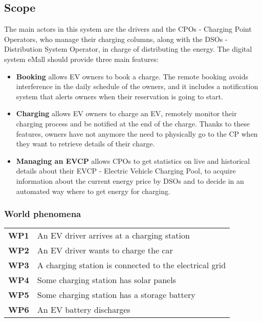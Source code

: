 \subsection{Scope}
The main actors in this system are the drivers and the CPOs - Charging Point Operators, who manage their charging columns, along with the DSOs - Distribution System Operator, in charge of distributing the energy.
The digital system eMall should provide three main features:
\begin{itemize}
    \item \textbf{Booking} allows EV owners to book a charge. The remote booking avoids interference
          in the daily schedule of the owners, and it includes a notification
          system that alerts owners when their reservation is going to start.
    \item \textbf{Charging} allows EV owners to charge an EV, remotely monitor their charging
          process and be notified at the end of the charge.
          Thanks to these features, owners have not anymore the need to
          physically go to the CP when they want to retrieve details of their charge.
    \item  \textbf{Managing an EVCP} allows CPOs to get statistics on live and historical details
          about their EVCP - Electric Vehicle Charging Pool, to acquire information about the current energy price by
          DSOs and to decide in an automated way where to get energy for charging.
\end{itemize}




\subsubsection{World phenomena}
\begin{table}[H]
    \begin{tabularx}{\textwidth}{cX}
        \toprule
        \textbf{WP1} & An EV driver arrives at a charging station             \\
        \textbf{WP2} & An EV driver wants to charge the car                   \\
        \textbf{WP3} & A charging station is connected to the electrical grid \\
        \textbf{WP4} & Some charging station has solar panels                 \\
        \textbf{WP5} & Some charging station has a storage battery            \\
        \textbf{WP6} & An EV battery discharges                               \\ \bottomrule
    \end{tabularx}
\end{table}
